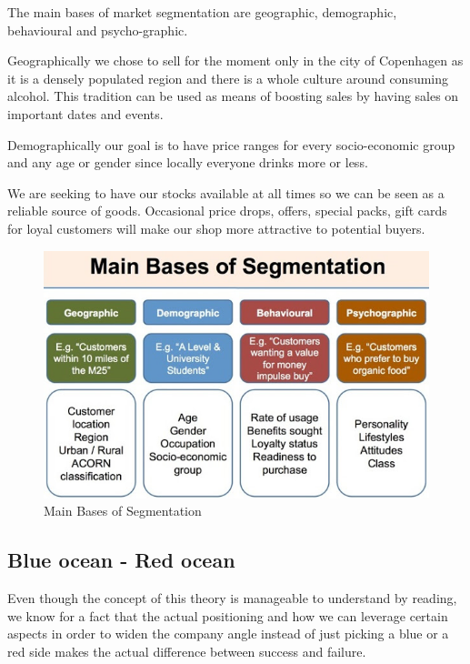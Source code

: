 \documentclass[12p]{article}
\begin{document}
The main bases of market segmentation are geographic, demographic, behavioural and psycho-graphic. 

Geographically we chose to sell for the moment only in the city of Copenhagen as it is a densely populated region and there is a whole culture around consuming alcohol. This tradition can be used as means of boosting sales by having sales on important dates and events.

Demographically our goal is to have price ranges for every socio-economic group and any age or gender since locally everyone drinks more or less.

We are seeking to have our stocks available at all times so we can be seen as a reliable source of goods. Occasional price drops, offers, special packs, gift cards for loyal customers will make our shop more attractive to potential buyers.

\begin{figure}
    \centering
    \includegraphics[width=1\textwidth]{market_segmentation}
    \caption{Main Bases of Segmentation \cite{MarketSegmentationBases}}
\end{figure}

\newpage


\subsection{Blue ocean - Red ocean} \label{BlueOceanRedOcean}

Even though the concept of this theory is manageable to understand by reading, we know for a fact that the actual positioning and how we can leverage certain aspects in order to widen the company angle instead of just picking a blue or a red side makes the actual difference between success and failure.
\end{document}
